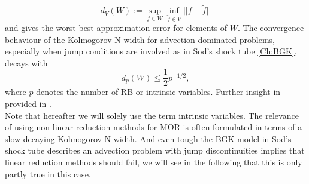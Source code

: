 \begin{equation}
	d_{V}(W):= \sup_{f \in W} \inf_{\tilde{f} \in V} ||f-\tilde{f}||
	\label{Eq:Kolmogorov}
\end{equation}
and gives the worst best approximation error for elements of \(W\). The convergence behaviour of the Kolmogorov N-width for advection dominated problems, especially when jump conditions are involved as in Sod's shock tube \cref{Ch:BGK}, decays with
\begin{equation}
	d_p(W) \leq \frac{1}{2} p^{-1/2},
	\label{Eq:KolmoAdv}
\end{equation}
where \(p\) denotes the number of RB or intrinsic variables. Further insight in provided in \cite{ohlberger2015reduced}.\\
Note that hereafter we will solely use the term intrinsic variables. The relevance of using non-linear reduction methods for MOR is often formulated in terms of a slow decaying Kolmogorov N-width. And even tough the BGK-model in Sod's shock tube describes an advection problem with jump discontinuities implies that linear reduction methods should fail, we will see in the following that this is only partly true in this case.

